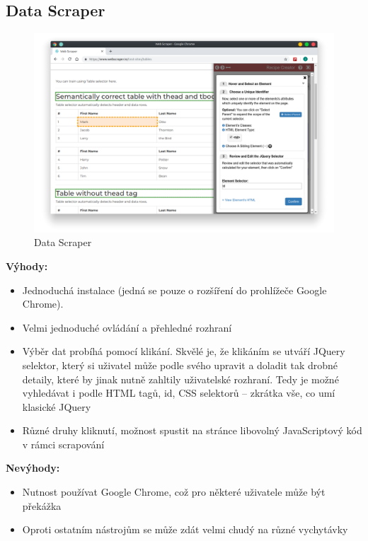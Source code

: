\documentclass[thesis=B,czech]{FITthesis}[2012/06/26]
\begin{document}
\newpage
\subsection{Data Scraper}
\begin{figure}[h]
	\includegraphics[width=\linewidth]{images/DataScraper.png}
	\caption{Data Scraper}
	\label{fig:dataScraper}
\end{figure}
\textbf{Výhody:}
\begin{itemize}
	\item Jednoduchá instalace (jedná se pouze o rozšíření do prohlížeče Google Chrome).
	\item Velmi jednoduché ovládání a přehledné rozhraní
	\item Výběr dat probíhá pomocí klikání. Skvělé je, že klikáním se utváří JQuery selektor, který si uživatel může podle svého upravit a doladit tak drobné detaily, které by jinak nutně zahltily uživatelské rozhraní. Tedy je možné vyhledávat i podle HTML tagů, id, CSS selektorů -- zkrátka vše, co umí klasické JQuery
	\item Různé druhy kliknutí, možnost spustit na stránce libovolný JavaScriptový kód v rámci scrapování
\end{itemize}

\textbf{Nevýhody:}
\begin{itemize}
	\item Nutnost používat Google Chrome, což pro některé uživatele může být překážka
	\item Oproti ostatním nástrojům se může zdát velmi chudý na různé vychytávky
\end{itemize}


\end{document}
